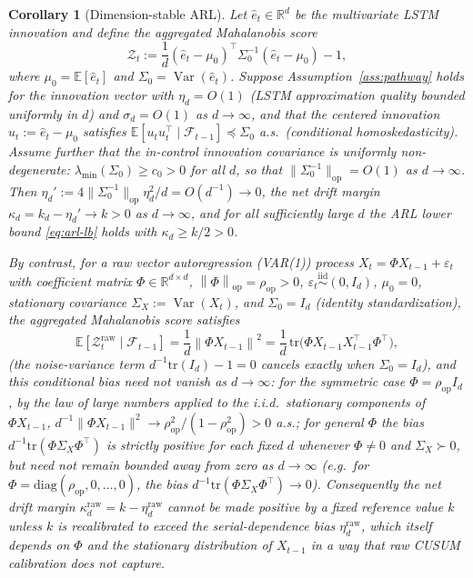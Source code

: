 \documentclass[bj,authoryear]{imsart}
\theoremstyle{plain}
\newtheorem{corollary}[theorem]{Corollary}
\theoremstyle{definition}
\newcommand{\E}{\mathbb{E}}
\newcommand{\R}{\mathbb{R}}
\newcommand{\F}{\mathcal{F}}
\newcommand{\norm}[1]{\left\lVert #1 \right\rVert}
\newcommand{\given}{\mid}
\newcommand{\iid}{\overset{\mathrm{iid}}{\sim}}
\DeclareMathOperator{\Var}{Var}
\begin{document}
\begin{corollary}[Dimension-stable ARL]
\label{cor:dim}
  Let $\hat{e}_t\in\R^d$ be the multivariate LSTM innovation and define
  the aggregated Mahalanobis score
  \[
    \mathcal{Z}_t
    :=\frac{1}{d}(\hat{e}_t-\mu_0)^\top\Sigma_0^{-1}(\hat{e}_t-\mu_0)-1,
  \]
  where $\mu_0=\E[\hat{e}_t]$ and $\Sigma_0=\Var(\hat{e}_t)$.
  Suppose Assumption~\ref{ass:pathway} holds for the innovation vector
  with $\eta_d=O(1)$ (LSTM approximation quality bounded uniformly in $d$)
  and $\sigma_d=O(1)$ as $d\to\infty$,
  and that the centered innovation $u_t:=\hat{e}_t-\mu_0$ satisfies
  $\E[u_t u_t^\top\given\F_{t-1}]\preceq\Sigma_0$ a.s.\
  (conditional homoskedasticity).
  Assume further that the in-control innovation covariance is uniformly
  non-degenerate: $\lambda_{\min}(\Sigma_0)\geq c_0>0$ for all $d$,
  so that $\|\Sigma_0^{-1}\|_{\mathrm{op}}=O(1)$ as $d\to\infty$.
  Then $\eta_d':=4\|\Sigma_0^{-1}\|_{\mathrm{op}}\eta_d^2/d=O(d^{-1})\to 0$,
  the net drift margin $\kappa_d=k_d-\eta_d'\to k>0$ as $d\to\infty$,
  and for all sufficiently large $d$ the ARL lower bound \eqref{eq:arl-lb}
  holds with $\kappa_d\geq k/2>0$.

  By contrast, for a raw vector autoregression (VAR(1)) process
  $X_t = \Phi X_{t-1}+\varepsilon_t$ with coefficient matrix
  $\Phi\in\R^{d\times d}$, $\norm{\Phi}_{\mathrm{op}}
  =\rho_{\mathrm{op}}>0$, $\varepsilon_t\iid(0,I_d)$, $\mu_0=0$,
  stationary covariance $\Sigma_X:=\Var(X_t)$, and
  $\Sigma_0=I_d$ (identity standardization), the aggregated
  Mahalanobis score satisfies
  \begin{equation}
    \E[\mathcal{Z}_t^{\mathrm{raw}}\given\F_{t-1}]
    =\frac{1}{d}\norm{\Phi X_{t-1}}^2
    =\frac{1}{d}\,\mathrm{tr}\!\bigl(\Phi X_{t-1}X_{t-1}^\top\Phi^\top\bigr),
    \label{eq:raw-bias}
  \end{equation}
  (the noise-variance term $d^{-1}\mathrm{tr}(I_d)-1=0$ cancels exactly
  when $\Sigma_0=I_d$), and this conditional bias need not vanish as $d\to\infty$:
  for the symmetric case $\Phi = \rho_{\mathrm{op}}I_d$, by the law of large numbers
  applied to the i.i.d.\ stationary components of $\Phi X_{t-1}$,
  $d^{-1}\|\Phi X_{t-1}\|^2 \to \rho_{\mathrm{op}}^2/(1-\rho_{\mathrm{op}}^2)>0$ a.s.;
  for general $\Phi$ the bias $d^{-1}\mathrm{tr}(\Phi\Sigma_X\Phi^\top)$ is strictly positive
  for each fixed $d$ whenever $\Phi\neq 0$ and $\Sigma_X\succ 0$, but
  need not remain bounded away from zero as $d\to\infty$ (e.g.\ for
  $\Phi=\mathrm{diag}(\rho_{\mathrm{op}},0,\ldots,0)$, the bias
  $d^{-1}\mathrm{tr}(\Phi\Sigma_X\Phi^\top)\to 0$).
  Consequently the net drift margin $\kappa_d^{\mathrm{raw}}=k-\eta_d^{\mathrm{raw}}$
  cannot be made positive by a fixed reference value $k$ unless $k$ is
  recalibrated to exceed the serial-dependence bias $\eta_d^{\mathrm{raw}}$,
  which itself depends on $\Phi$ and the stationary distribution of $X_{t-1}$
  in a way that raw CUSUM calibration does not capture.
\end{corollary}
\end{document}
